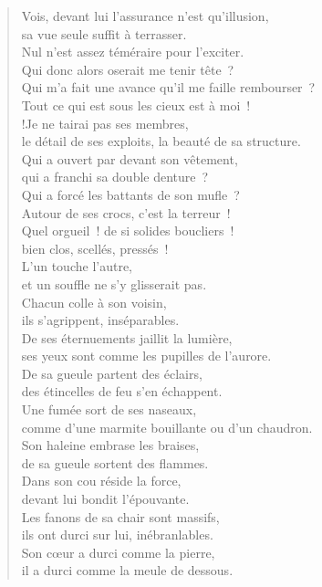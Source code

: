 \documentclass[french,twoside]{book} %
\begin{document}
\begin{verse}
Vois, devant lui l’assurance n’est qu’illusion, \\
sa vue seule suffit à terrasser.\\
Nul n’est assez téméraire pour l’exciter. \\
Qui donc alors oserait me tenir tête ?\\
Qui m’a fait une avance qu’il me faille rembourser ? \\
Tout ce qui est sous les cieux est à moi !\\!Je ne tairai pas ses membres, \\
le détail de ses exploits, la beauté de sa structure.\\
Qui a ouvert par devant son vêtement, \\
qui a franchi sa double denture ?\\
Qui a forcé les battants de son mufle ? \\
Autour de ses crocs, c’est la terreur !\\
Quel orgueil ! de si solides boucliers ! \\
bien clos, scellés, pressés !\\
L’un touche l’autre, \\
et un souffle ne s’y glisserait pas.\\
Chacun colle à son voisin, \\
ils s’agrippent, inséparables.\\
De ses éternuements jaillit la lumière, \\
ses yeux sont comme les pupilles de l’aurore.\\
De sa gueule partent des éclairs, \\
des étincelles de feu s’en échappent.\\
Une fumée sort de ses naseaux, \\
comme d’une marmite bouillante ou d’un chaudron.\\
Son haleine embrase les braises, \\
de sa gueule sortent des flammes.\\
Dans son cou réside la force, \\
devant lui bondit l’épouvante.\\
Les fanons de sa chair sont massifs, \\
ils ont durci sur lui, inébranlables.\\
Son cœur a durci comme la pierre, \\
il a durci comme la meule de dessous.\\

\end{verse}
\end{document}
